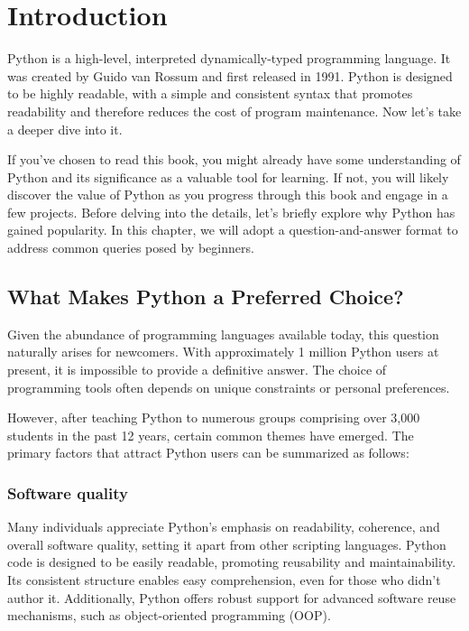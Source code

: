 \documentclass[12pt]{book}
\begin{document}
\tableofcontents

\printindex 

\newpage
\chapter{Introduction}


Python is a high-level, interpreted dynamically-typed programming language. It was created by Guido van Rossum and first released in 1991. Python is designed to be highly readable, with a simple and consistent syntax that promotes readability and therefore reduces the cost of program maintenance. Now let's take a deeper dive into it.



If you've chosen to read this book, you might already have some understanding of Python and its significance as a valuable tool for learning. If not, you will likely discover the value of Python as you progress through this book and engage in a few projects. Before delving into the details, let's briefly explore why Python has gained popularity. In this chapter, we will adopt a question-and-answer format to address common queries posed by beginners.

\section{What Makes Python a Preferred Choice?}

Given the abundance of programming languages available today, this question naturally arises for newcomers. With approximately 1 million Python users at present, it is impossible to provide a definitive answer. The choice of programming tools often depends on unique constraints or personal preferences.

However, after teaching Python to numerous groups comprising over 3,000 students in the past 12 years, certain common themes have emerged. The primary factors that attract Python users can be summarized as follows:

\subsection{Software quality}

Many individuals appreciate Python's emphasis on readability, coherence, and overall software quality, setting it apart from other scripting languages. Python code is designed to be easily readable, promoting reusability and maintainability. Its consistent structure enables easy comprehension, even for those who didn't author it. Additionally, Python offers robust support for advanced software reuse mechanisms, such as object-oriented programming (OOP).
\end{document}
